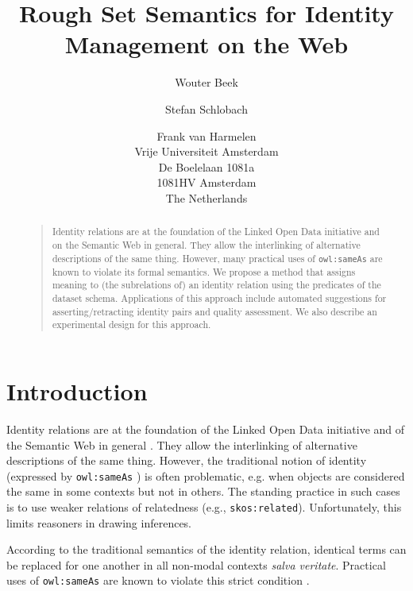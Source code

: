 \documentclass[letterpaper]{article}
\begin{document}
\title{Rough Set Semantics for Identity Management on the Web}
\author{Wouter Beek \and Stefan Schlobach \and Frank van Harmelen\\
Vrije Universiteit Amsterdam\\
De Boelelaan 1081a\\
1081HV Amsterdam\\
The Netherlands}
\maketitle
\begin{abstract}
\begin{quote}
Identity relations are at the foundation of the Linked Open Data initiative
  and on the Semantic Web in general.
They allow the interlinking of alternative descriptions of the same thing.
However, many practical uses of \verb|owl:sameAs| are known to violate its
  formal semantics.
We propose a method that assigns meaning to (the subrelations of)
  an identity relation using the predicates of the dataset schema.
Applications of this approach include automated suggestions for
  asserting/retracting identity pairs and quality assessment.
We also describe an experimental design for this approach.
\end{quote}
\end{abstract}

\section{Introduction}
\label{sec:introduction}

Identity relations are at the foundation of the Linked Open Data initiative
  and of the Semantic Web in general \cite{bizer_cyganiak_heath_2007}.
They allow the interlinking of alternative descriptions of the same thing.
However, the traditional notion of identity
  (expressed by \verb|owl:sameAs| \cite{motic_paterschneider_grau_2012})
  is often problematic, e.g. when objects are considered the same in some
  contexts but not in others.
The standing practice in such cases is to use weaker relations of relatedness
  (e.g., \verb|skos:related|).
Unfortunately, this limits reasoners in drawing inferences.

According to the traditional semantics of the identity relation,
  identical terms can be replaced for one another in all non-modal contexts
  \emph{salva veritate}.
Practical uses of \verb|owl:sameAs| are known to violate this strict condition
  \cite{halpin_hayes_2010,halpin_hayes_mccusker_mcguinness_thompson_2010}.
\end{document}
